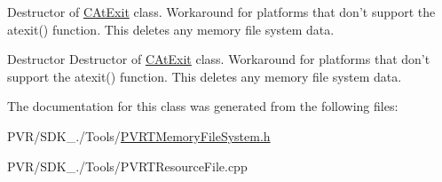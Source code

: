 Destructor of \hyperlink{class_c_p_v_r_t_memory_file_system_1_1_c_at_exit}{C\+At\+Exit} class. Workaround for platforms that don't support the atexit() function. This deletes any memory file system data. 







  Destructor  Destructor of \hyperlink{class_c_p_v_r_t_memory_file_system_1_1_c_at_exit}{C\+At\+Exit} class. Workaround for platforms that don't support the atexit() function. This deletes any memory file system data. 

The documentation for this class was generated from the following files\+:\begin{DoxyCompactItemize}
\item 
P\+V\+R/\+S\+D\+K\+\_./\+Tools/\hyperlink{_p_v_r_t_memory_file_system_8h}{P\+V\+R\+T\+Memory\+File\+System.\+h}\item 
P\+V\+R/\+S\+D\+K\+\_./\+Tools/P\+V\+R\+T\+Resource\+File.\+cpp\end{DoxyCompactItemize}
